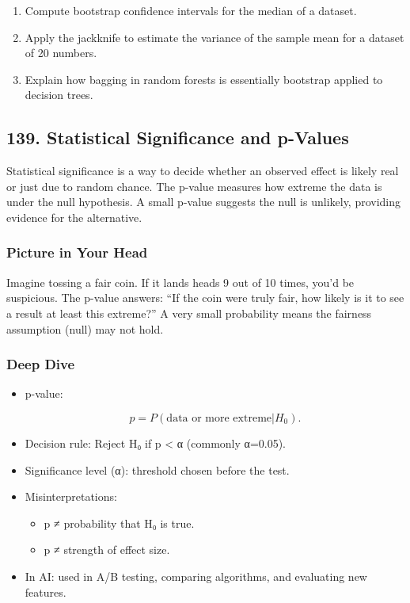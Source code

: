 \documentclass[
  letterpaper,
  DIV=11,
  numbers=noendperiod]{scrreprt}
\providecommand{\tightlist}{%
  \setlength{\itemsep}{0pt}\setlength{\parskip}{0pt}}
\begin{document}
\begin{enumerate}
\def\labelenumi{\arabic{enumi}.}
\tightlist
\item
  Compute bootstrap confidence intervals for the median of a dataset.
\item
  Apply the jackknife to estimate the variance of the sample mean for a
  dataset of 20 numbers.
\item
  Explain how bagging in random forests is essentially bootstrap applied
  to decision trees.
\end{enumerate}

\subsection{139. Statistical Significance and
p-Values}\label{statistical-significance-and-p-values}

Statistical significance is a way to decide whether an observed effect
is likely real or just due to random chance. The p-value measures how
extreme the data is under the null hypothesis. A small p-value suggests
the null is unlikely, providing evidence for the alternative.

\subsubsection{Picture in Your Head}\label{picture-in-your-head-138}

Imagine tossing a fair coin. If it lands heads 9 out of 10 times, you'd
be suspicious. The p-value answers: ``If the coin were truly fair, how
likely is it to see a result at least this extreme?'' A very small
probability means the fairness assumption (null) may not hold.

\subsubsection{Deep Dive}\label{deep-dive-138}

\begin{itemize}
\item
  p-value:

  \[
  p = P(\text{data or more extreme} | H_0).
  \]
\item
  Decision rule: Reject H₀ if p \textless{} α (commonly α=0.05).
\item
  Significance level (α): threshold chosen before the test.
\item
  Misinterpretations:

  \begin{itemize}
  \tightlist
  \item
    p ≠ probability that H₀ is true.
  \item
    p ≠ strength of effect size.
  \end{itemize}
\item
  In AI: used in A/B testing, comparing algorithms, and evaluating new
  features.
\end{itemize}
\end{document}

